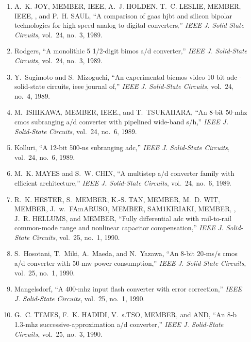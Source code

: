\begin{enumerate}
\item
A.~K. JOY, MEMBER, IEEE, A.~J. HOLDEN, T.~C. LESLIE, MEMBER, IEEE, , and P.~H.
  SAUL, ``A comparison of gaas hjbt and silicon bipolar technologies for
  high-speed analog-to-digital converters,'' \emph{{IEEE} J. Solid-State
  Circuits}, vol.~24, no.~3, 1989.

\item
Rodgers, ``A monolithic 5 1/2-digit bimos a/d converter,'' \emph{{IEEE} J.
  Solid-State Circuits}, vol.~24, no.~3, 1989.

\item
Y.~Sugimoto and S.~Mizoguchi, ``An experimental bicmos video 10 bit adc -
  solid-state circuits, ieee journal of,'' \emph{{IEEE} J. Solid-State
  Circuits}, vol.~24, no.~4, 1989.

\item
M.~ISHIKAWA, MEMBER, IEEE., and T.~TSUKAHARA, ``An 8-bit 50-mhz cmos subranging
  a/d converter with pipelined wide-band s/h,'' \emph{{IEEE} J. Solid-State
  Circuits}, vol.~24, no.~6, 1989.

\item
Kolluri, ``A 12-bit 500-ns subranging adc,'' \emph{{IEEE} J. Solid-State
  Circuits}, vol.~24, no.~6, 1989.

\item
M.~K. MAYES and S.~W. CHIN, ``A multistep a/d converter family with efficient
  architecture,'' \emph{{IEEE} J. Solid-State Circuits}, vol.~24, no.~6, 1989.

\item
R.~K. HESTER, S.~MEMBER, K.-S. TAN, MEMBER, M.~D. WIT, MEMBER, J.~w.~FAmARUSO,
  MEMBER, SAM1KIRIAKI, MEMBER, , J.~R. HELLUMS, and MEMBER, ``Fully
  differential adc with rail-to-rail common-mode range and nonlinear capacitor
  compensation,'' \emph{{IEEE} J. Solid-State Circuits}, vol.~25, no.~1, 1990.

\item
S.~Hosotani, T.~Miki, A.~Maeda, and N.~Yazawa, ``An 8-bit 20-ms/s cmos a/d
  converter with 50-mw power consumption,'' \emph{{IEEE} J. Solid-State
  Circuits}, vol.~25, no.~1, 1990.

\item
Mangelsdorf, ``A 400-mhz input flash converter with error correction,''
  \emph{{IEEE} J. Solid-State Circuits}, vol.~25, no.~1, 1990.

\item
G.~C. TEMES, F.~K. HADIDI, V.~s.TSO, MEMBER, and AND, ``An 8-b 1.3-mhz
  successive-approximation a/d converter,'' \emph{{IEEE} J. Solid-State
  Circuits}, vol.~25, no.~3, 1990.


\end{enumerate}
